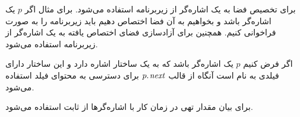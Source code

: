 برای تخصیص فضا به یک اشاره‌گر از زیربرنامه {} استفاده می‌شود. برای مثال اگر {$p$} یک اشاره‌گر باشد و بخواهیم به آن فضا اختصاص دهیم باید زیربرنامه {} را به صورت {} فراخوانی کنیم. همچنین برای آزادسازی فضای اختصاص یافته به یک اشاره‌گر از زیربرنامه {} استفاده می‌شود.

اگر فرض کنیم {$p$} یک اشاره‌گر باشد که به یک ساختار اشاره دارد و این ساختار دارای فیلدی به نام {} است آنگاه از قالب {$p.\hspace*{1pt}\mathit{next}$} برای دسترسی به محتوای فیلد {} استفاده می‌شود.

برای بیان مقدار تهی در زمان کار با اشاره‌گرها از ثابت {} استفاده می‌شود.